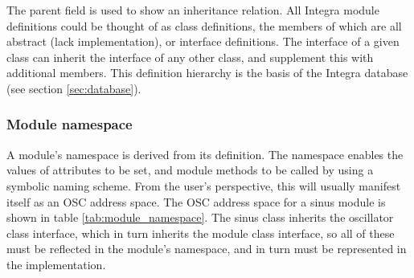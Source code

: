 The parent field is used to show an inheritance relation. All Integra
module definitions could be thought of as class definitions, the
members of which are all abstract (lack implementation), or interface
definitions. The interface of a given class can inherit the interface
of any other class, and supplement this with additional members. This
definition hierarchy is the basis of the Integra database (see section
\ref{sec:database}).

\subsubsection{Module namespace}\label{subsubsec:module_namespace}

A module's namespace is derived from its definition. The namespace
enables the values of attributes to be set, and module methods to be
called by using a symbolic naming scheme.  From the user's
perspective, this will usually manifest itself as an OSC address
space. The OSC address space for a sinus module is shown in table
\ref{tab:module_namespace}. The sinus class inherits the oscillator
class interface, which in turn inherits the module class interface, so
all of these must be reflected in the module's namespace, and in turn
must be represented in the implementation.


